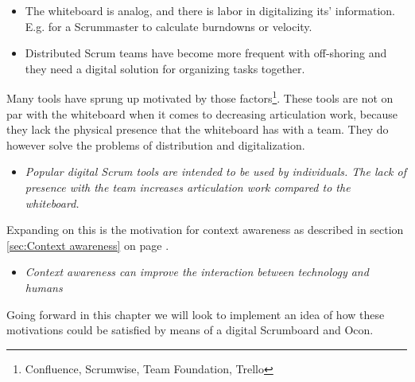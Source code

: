 \documentclass[../report.tex]{subfiles}
\begin{document}
\begin{itemize}
\item The whiteboard is analog, and there is labor in digitalizing its' information. E.g. for a Scrummaster to calculate burndowns or velocity.
\item Distributed Scrum teams have become more frequent with off-shoring and they need a digital solution for organizing tasks together.
\end{itemize}

Many tools have sprung up motivated by those factors\footnote{Confluence, Scrumwise, Team Foundation, Trello}. These tools are not on par with the whiteboard when it comes to decreasing articulation work, because they lack the physical presence that the whiteboard has with a team. They do however solve the problems of distribution and digitalization.

\begin{itemize}
\item[\textbf{Motivation 1}] \textit{Popular digital Scrum tools are intended to be used by individuals. The lack of presence with the team increases articulation work compared to the whiteboard.}
\end{itemize}

Expanding on this is the motivation for context awareness as described in section \ref{sec:Context awareness} on page \pageref{sec:Context awareness}.

\begin{itemize}
\item[\textbf{Motivation 2}] \textit{Context awareness can improve the interaction between technology and humans}
\end{itemize}


Going forward in this chapter we will look to implement an idea of how these motivations could be satisfied by means of a digital Scrumboard and Ocon.




\end{document}
